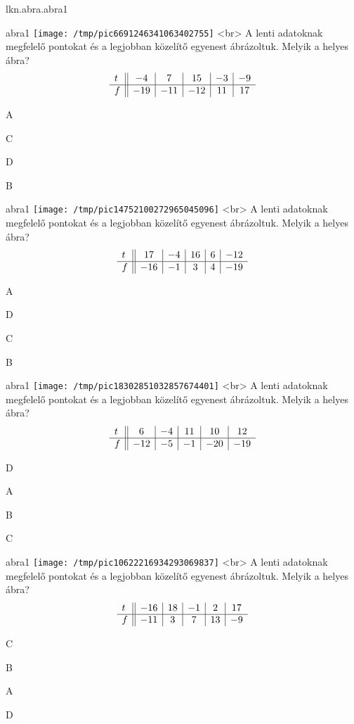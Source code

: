 \documentclass[12pt]{article}
\begin{document}
\begin{quiz}{lkn.abra.abra1}\begin{multi}{abra1}
\texttt{[image: /tmp/pic6691246341063402755]}
<br>
A lenti adatoknak megfelelő pontokat és a 
legjobban közelítő egyenest ábrázoltuk. Melyik a helyes ábra?
$$\begin{array}{l ||c|c|c|c|c}t&-4&7&15&-3&-9\\ \hline f&-19&-11&-12&11&17 \\ \end{array}$$
  \item* A
    \item  C
    \item  D
    \item  B
    \end{multi}
    

\begin{multi}{abra1}
\texttt{[image: /tmp/pic14752100272965045096]}
<br>
A lenti adatoknak megfelelő pontokat és a 
legjobban közelítő egyenest ábrázoltuk. Melyik a helyes ábra?
$$\begin{array}{l ||c|c|c|c|c}t&17&-4&16&6&-12\\ \hline f&-16&-1&3&4&-19 \\ \end{array}$$
  \item* A
    \item  D
    \item  C
    \item  B
    \end{multi}
    

\begin{multi}{abra1}
\texttt{[image: /tmp/pic18302851032857674401]}
<br>
A lenti adatoknak megfelelő pontokat és a 
legjobban közelítő egyenest ábrázoltuk. Melyik a helyes ábra?
$$\begin{array}{l ||c|c|c|c|c}t&6&-4&11&10&12\\ \hline f&-12&-5&-1&-20&-19 \\ \end{array}$$
  \item* D
    \item  A
    \item  B
    \item  C
    \end{multi}
    

\begin{multi}{abra1}
\texttt{[image: /tmp/pic10622216934293069837]}
<br>
A lenti adatoknak megfelelő pontokat és a 
legjobban közelítő egyenest ábrázoltuk. Melyik a helyes ábra?
$$\begin{array}{l ||c|c|c|c|c}t&-16&18&-1&2&17\\ \hline f&-11&3&7&13&-9 \\ \end{array}$$
  \item* C
    \item  B
    \item  A
    \item  D
    \end{multi}
    


\end{quiz}
\end{document}
